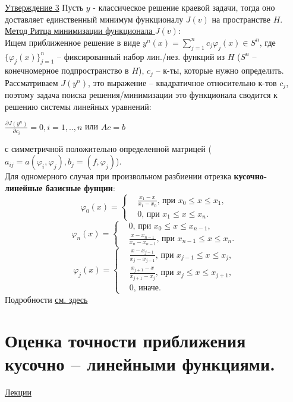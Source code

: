 \documentclass[specialist, subf, href, colorlinks=true, 12pt, times, mtpro, final]{disser}
\theoremstyle{definition}
\begin{document}
{    \hyperlink {lects.99}{Утверждение 3} Пусть $y$ - классическое решение краевой задачи, тогда оно доставляет единственный минимум функционалу $J(v)$ на пространстве $H$.\\
    \hyperlink {lects.99}{Метод Ритца минимизации функционала $J(v)$}:\\
    Ищем приближенное решение в виде $y^n(x) = \sum\limits^n_{j=1}c_j\varphi_j(x) \in S^n$, где $\{\varphi_j(x)\}^n_{j=1}$ \--- фиксированный набор лин./нез. функций из $H$ ($S^n$ -- конечномерное подпространство в $H$), $c_j$ \--- к-ты, которые нужно определить.\\
    Рассматриваем $J(y^n)$,  это выражение \--- квадратичное относительно к-тов $c_j$, поэтому задача поиска решения/минимизации это функционала сводится к решению системы линейных уравнений:
    \begin{center}
    $\frac{\partial J(y^n)}{\partial c_i} = 0, i=1,..,n$ или $Ac=b$
    \end{center}
    с симметричной положительно определенной матрицей ($a_{ij} = a(\varphi_i,\varphi_j), b_j = (f, \varphi_j)$).\\
    Для одномерного случая при произвольном разбиении отрезка \textbf {кусочно-линейные базисные фунции}:
    $$
        \varphi_0(x) = 
        \left\{
        \begin{aligned}
            & \frac{x_1 - x}{x_1 - x_0} \text{, при } x_0 \le x \le x_1,\\
            & 0 \text{, при } x_1 \le x \le x_n.
        \end{aligned}
        \right.
    $$
    $$
        \varphi_n(x) = 
        \left\{
        \begin{aligned}
            & 0 \text{, при } x_0 \le x \le x_{n-1},\\
            & \frac{x - x_{n-1}}{x_n - x_{n-1}} \text{, при } x_{n-1} \le x \le x_n.
        \end{aligned}
        \right.
    $$
    $$
        \varphi_j(x) = 
        \left\{
        \begin{aligned}
            & \frac{x - x_{j-1}}{x_j - x_{j-1}} \text{, при } x_{j-1} \le x \le x_{j},\\
            & \frac{x_{j+1} - x}{x_{j+1} - x_j} \text{, при } x_j \le x \le x_{j+1},\\
            & 0 \text{, иначе.}
        \end{aligned}
        \right.
    $$
    Подробности \hyperlink {lects.100}{см. здесь}

\section {Оценка точности приближения кусочно -- линейными функциями.}
    \hyperlink {lects.102}{Лекции}\\
    
}
\end{document}
